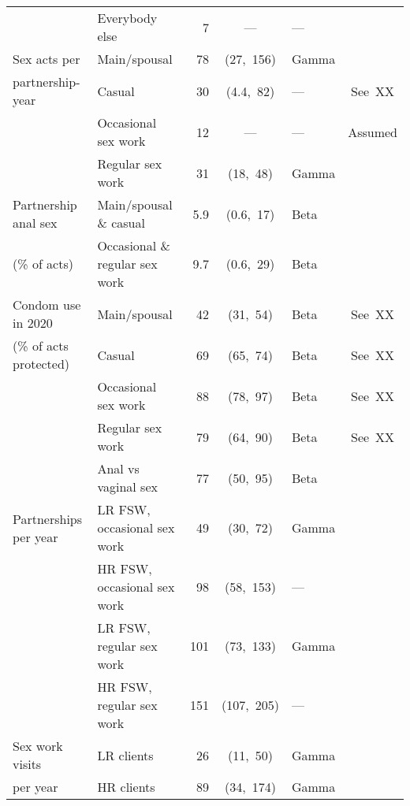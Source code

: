 \begin{tabular}{llrclc}
                          & Everybody else                 &    7 &    ---     & ---      &         \\[1ex]
  Sex acts per            & Main/spousal                   &   78 & (27,~156)  & Gamma    &         \\
  partnership-year        & Casual                         &   30 & (4.4,~82)  & ---      & See~XX  \\
                          & Occasional sex work            &   12 &    ---     & ---      & Assumed \\
                          & Regular sex work               &   31 &  (18,~48)  & Gamma    &         \\[1ex]
  Partnership anal sex    & Main/spousal \& casual         &  5.9 & (0.6,~17)  & Beta     &         \\
  (\% of acts)            & Occasional \& regular sex work &  9.7 & (0.6,~29)  & Beta     &         \\[1ex]
  Condom use in 2020      & Main/spousal                   &   42 &  (31,~54)  & Beta     & See~XX  \\
  (\% of acts protected)  & Casual                         &   69 &  (65,~74)  & Beta     & See~XX  \\
                          & Occasional sex work            &   88 &  (78,~97)  & Beta     & See~XX  \\
                          & Regular sex work               &   79 &  (64,~90)  & Beta     & See~XX  \\
                          & Anal vs vaginal sex            &   77 &  (50,~95)  & Beta     &         \\[1ex]
  Partnerships per year   & LR FSW, occasional sex work    &   49 &  (30,~72)  & Gamma    &         \\
                          & HR FSW, occasional sex work    &   98 & (58,~153)  & ---      &         \\
                          & LR FSW, regular sex work       &  101 & (73,~133)  & Gamma    &         \\
                          & HR FSW, regular sex work       &  151 & (107,~205) & ---      &         \\[1ex]
  Sex work visits         & LR clients                     &   26 &  (11,~50)  & Gamma    &         \\
  per year                & HR clients                     &   89 & (34,~174)  & Gamma    &         \\
  \bottomrule
\end{tabular} 
